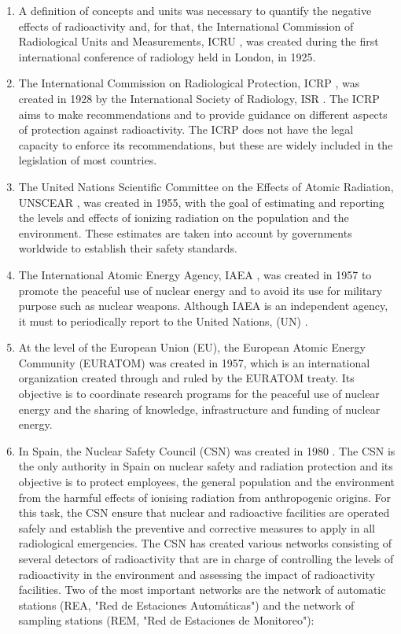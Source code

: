 \begin{enumerate}
\item{} A definition of concepts and units was necessary to quantify the negative effects of radioactivity and, for that, the International Commission of Radiological Units and Measurements, ICRU \cite{ICRU}, was created during the first international conference of radiology held in London, in 1925.

\item{} The International Commission on Radiological Protection, ICRP \cite{ICRP}, was created in 1928 by the International Society of Radiology, ISR \cite{ISR}. The ICRP aims to make recommendations and to provide guidance on different aspects of protection against radioactivity. The ICRP does not have the legal capacity to enforce its recommendations, but these are widely included in the legislation of most countries. %

\item{} The United Nations Scientific Committee on the Effects of Atomic Radiation, UNSCEAR \cite{UNSCEAR}, was created in 1955, with the goal of estimating and reporting the levels and effects of ionizing radiation on the population and the environment. These estimates are taken into account by governments worldwide to establish their safety standards.

\item{} The International Atomic Energy Agency, IAEA \cite{IAEA}, was created in 1957 to promote the peaceful use of nuclear energy and to avoid its use for military purpose such as nuclear weapons. Although IAEA is an independent agency, it must to periodically report to the United Nations, (UN) \cite{UN}.

\item{} At the level of the European Union (EU), the European Atomic Energy Community (EURATOM) was created in 1957, which is an international organization created through and ruled by the EURATOM treaty. Its objective is to coordinate research programs for the peaceful use of nuclear energy and the sharing of knowledge, infrastructure and funding of nuclear energy.

\item{} In Spain, the Nuclear Safety Council (CSN) was created in 1980 \cite{CSN}. The CSN is the only authority in Spain on nuclear safety and radiation protection and its objective is to protect employees, the general population and the environment from the harmful effects of ionising radiation from anthropogenic origins. For this task, the CSN ensure that nuclear and radioactive facilities are operated safely and establish the preventive and corrective measures to apply in all radiological emergencies. The CSN has created various networks consisting of several detectors of radioactivity that are in charge of controlling the levels of radioactivity in the environment and assessing the impact of radioactivity facilities. Two of the most important networks are the network of automatic stations (REA, "Red de Estaciones Automáticas") and the network of sampling stations (REM, "Red de Estaciones de Monitoreo"):


\end{enumerate}
